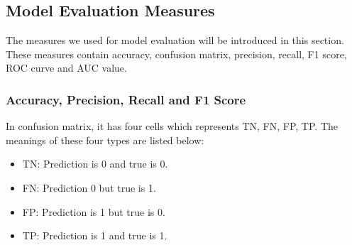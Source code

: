 \documentclass[final-report]{report-template}
\begin{document}



\subsection{Model Evaluation Measures}
\label{sec:model_evaluate_measures}
The measures we used for model evaluation will be introduced in this section. 
These measures contain accuracy, confusion matrix, precision, recall, F1 score, ROC curve and AUC value.

\subsubsection{Accuracy, Precision, Recall and F1 Score}
\label{sec:APRF}
In confusion matrix, it has four cells which represents TN, FN, FP, TP.
The meanings of these four types are listed below:
\begin{itemize}
    \item TN: Prediction is 0 and true is 0. 
    \item FN: Prediction 0 but true is 1. 
    \item FP: Prediction is 1 but true is 0.
    \item TP: Prediction is 1 and true is 1.
\end{itemize}
\end{document}
